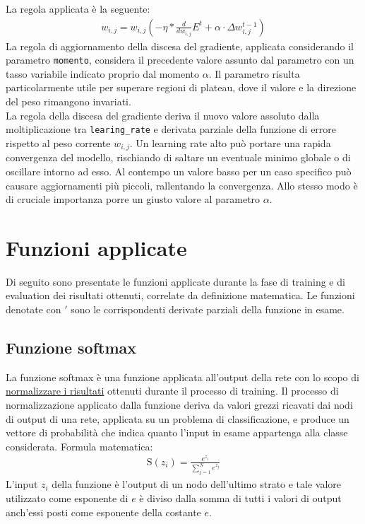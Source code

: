 La regola applicata è la seguente:
\begin{align*}
w_{i,j} = w_{i,j} (- \eta * \frac{d}{dw_{i,j}}E^t + \alpha \cdot \Delta w_{i,j}^{t-1})
\end{align*}
La regola di aggiornamento della discesa del gradiente, applicata considerando il parametro \texttt{momento}, considera il precedente valore assunto dal parametro con un tasso variabile indicato proprio dal momento $\alpha$. Il parametro risulta particolarmente utile per superare regioni di plateau, dove il valore e la direzione del peso rimangono invariati.  \\
La regola della discesa del gradiente deriva il nuovo valore assoluto dalla moltiplicazione tra \texttt{learing\_rate} e derivata parziale della funzione di errore rispetto al peso corrente $w_{i,j}$. Un learning rate alto può portare una rapida convergenza del modello, rischiando di saltare un eventuale minimo globale o di oscillare intorno ad esso. Al contempo un valore basso per un caso specifico può causare aggiornamenti più piccoli, rallentando la convergenza. Allo stesso modo è di cruciale importanza porre un giusto valore al parametro $\alpha$.

\section{Funzioni applicate}
Di seguito sono presentate le funzioni applicate durante la fase di training e di evaluation dei risultati ottenuti, correlate da definizione matematica. Le funzioni denotate con $'$ sono le corrispondenti derivate parziali della funzione in esame.
\subsection{Funzione softmax}
La funzione softmax è una funzione applicata all'output della rete con lo scopo di \underline{normalizzare i risultati} ottenuti durante il processo di training. Il processo di normalizzazione applicato dalla funzione deriva da valori grezzi ricavati dai nodi di output di una rete, applicata su un problema di classificazione, e produce un vettore di probabilità che indica quanto l'input in esame appartenga alla classe considerata. Formula matematica:
\begin{align*}
\text{S}(z_i) = \frac{e^{z_i}}{\sum_{j=1}^{N} e^{z_j}}
\end{align*}
L'input $z_i$ della funzione è l'output di un nodo dell'ultimo strato e tale valore utilizzato come esponente di $e$ è diviso dalla somma di tutti i valori di output anch'essi posti come esponente della costante $e$.
